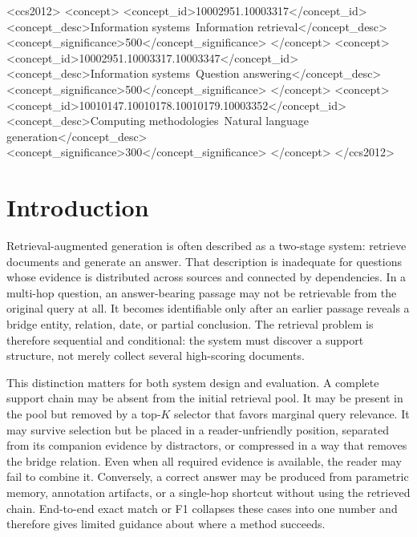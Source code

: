\documentclass[manuscript,review]{acmart}
\theoremstyle{definition}
\theoremstyle{plain}
\theoremstyle{remark}
\begin{document}
\begin{CCSXML}
<ccs2012>
<concept>
<concept_id>10002951.10003317</concept_id>
<concept_desc>Information systems~Information retrieval</concept_desc>
<concept_significance>500</concept_significance>
</concept>
<concept>
<concept_id>10002951.10003317.10003347</concept_id>
<concept_desc>Information systems~Question answering</concept_desc>
<concept_significance>500</concept_significance>
</concept>
<concept>
<concept_id>10010147.10010178.10010179.10003352</concept_id>
<concept_desc>Computing methodologies~Natural language generation</concept_desc>
<concept_significance>300</concept_significance>
</concept>
</ccs2012>
\end{CCSXML}



\maketitle
\section{Introduction}
\label{sec:introduction}

Retrieval-augmented generation is often described as a two-stage system:
retrieve documents and generate an answer. That description is inadequate
for questions whose evidence is distributed across sources and connected by
dependencies. In a multi-hop question, an answer-bearing passage may not be
retrievable from the original query at all. It becomes identifiable only
after an earlier passage reveals a bridge entity, relation, date, or partial
conclusion. The retrieval problem is therefore sequential and conditional:
the system must discover a support structure, not merely collect several
high-scoring documents.

This distinction matters for both system design and evaluation. A complete
support chain may be absent from the initial retrieval pool. It may be
present in the pool but removed by a top-$K$ selector that favors marginal
query relevance. It may survive selection but be placed in a reader-unfriendly
position, separated from its companion evidence by distractors, or compressed
in a way that removes the bridge relation. Even when all required evidence is
available, the reader may fail to combine it. Conversely, a correct answer
may be produced from parametric memory, annotation artifacts, or a single-hop
shortcut without using the retrieved chain. End-to-end exact match or F1
collapses these cases into one number and therefore gives limited guidance
about where a method succeeds.
\end{document}
